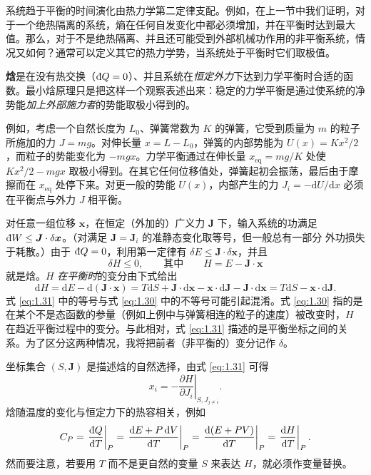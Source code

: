 
系统趋于平衡的时间演化由热力学第二定律支配。例如，在上一节中我们证明，对于一个绝热隔离的系统，熵在任何自发变化中都必须增加，并在平衡时达到最大值。那么，对于不是绝热隔离、并且还可能受到外部机械功作用的非平衡系统，情况又如何？通常可以定义其它的热力学势，当系统处于平衡时它们取极值。


\textbf{焓}是在没有热交换（$\inexd Q=0$）、并且系统在\emph{恒定外力}下达到力学平衡时合适的函数。最小焓原理只是把这样一个观察表述出来：稳定的力学平衡是通过使系统的净势能\emph{加上外部施力者}的势能取极小得到的。

例如，考虑一个自然长度为 $L_0$、弹簧常数为 $K$ 的弹簧，它受到质量为 $m$ 的粒子所施加的力 $J=mg$。对伸长量 $x=L-L_0$，弹簧的内部势能为 $U(x)=Kx^2/2$，而粒子的势能变化为 $-mgx$。力学平衡通过在伸长量 $x_{\text{eq}}=mg/K$ 处使 $Kx^2/2-mgx$ 取极小得到。在其它任何位移值处，弹簧起初会振荡，最后由于摩擦而在 $x_{\text{eq}}$ 处停下来。对更一般的势能 $U(x)$，内部产生的力 $J_i=-\mathrm{d}U/\mathrm{d}x$ 必须在平衡点与外力 $J$ 相平衡。

对任意一组位移 $\bm{x}$，在恒定（外加的）广义力 $\bm{J}$ 下，输入系统的功满足 $\inexd W\le\bm{J}\cdot\delta\bm{x}$。（对满足 $\bm{J}=\bm{J}_i$ 的准静态变化取等号，但一般总有一部分
外功损失于耗散。）由于 $\inexd Q=0$，利用第一定律有 $\delta E\le\bm{J}\cdot\delta\bm{x}$，并且
\begin{equation}
\delta H\le0,\qquad\text{其中}\qquad H=E-\bm{J}\cdot\bm{x}
\label{eq:1.30}
\end{equation}
就是焓。$H$ \emph{在平衡时}的变分由下式给出
\begin{equation}
\mathrm{d}H=\mathrm{d}E-\mathrm{d}(\bm{J}\cdot\bm{x})=T\mathrm{d}S+\bm{J}\cdot\mathrm{d}\bm{x}-\bm{x}\cdot\mathrm{d}\bm{J}-\bm{J}\cdot\mathrm{d}\bm{x}=T\mathrm{d}S-\bm{x}\cdot\mathrm{d}\bm{J}.
\label{eq:1.31}
\end{equation}
式 \eqref{eq:1.31} 中的等号与式 \eqref{eq:1.30} 中的不等号可能引起混淆。式 \eqref{eq:1.30} 指的是在某个不是态函数的参量（例如上例中与弹簧相连的粒子的速度）被改变时，$H$ 在趋近平衡过程中的变分。与此相对，式 \eqref{eq:1.31} 描述的是平衡坐标之间的关系。为了区分这两种情况，我将把前者（非平衡的）变分记作 $\delta$。

坐标集合 $(S,\bm{J})$ 是描述焓的自然选择，由式 \eqref{eq:1.31} 可得
\begin{equation}
x_i=-\left.\frac{\partial H}{\partial J_i}\right|_{S,J_{j\neq i}}.
\label{eq:1.32}
\end{equation}
焓随温度的变化与恒定力下的热容相关，例如
\begin{equation}
C_P=\left.\frac{\inexd Q}{\mathrm{d}T}\right|_P=\left.\frac{\mathrm{d}E+P\,\mathrm{d}V}{\mathrm{d}T}\right|_P=\left.\frac{\mathrm{d}(E+PV)}{\mathrm{d}T}\right|_P=\left.\frac{\mathrm{d}H}{\mathrm{d}T}\right|_P.
\label{eq:1.33}
\end{equation}
然而要注意，若要用 $T$ 而不是更自然的变量 $S$ 来表达 $H$，就必须作变量替换。

